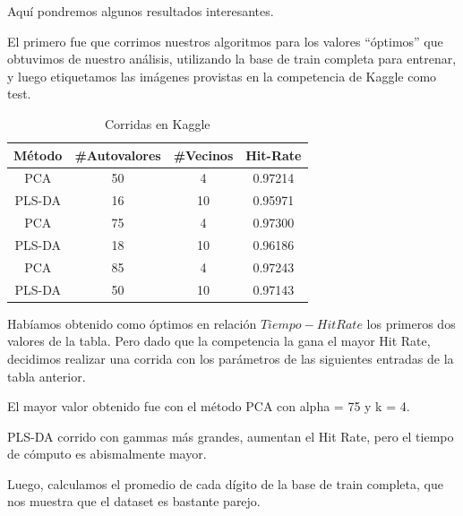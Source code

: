 Aqu\'i pondremos algunos resultados interesantes.

El primero fue que corrimos nuestros algoritmos para los valores ``\'optimos'' que obtuvimos de nuestro an\'alisis, utilizando la base de train completa para entrenar, y luego etiquetamos las im\'agenes provistas en la competencia de Kaggle como test.

\begin{table}[h!]
\begin{center}
\begin{tabular}{|c|c|c|c|}
	\hline
	M\'etodo & \#Autovalores & \#Vecinos & Hit-Rate \\
	\hline
	PCA & 50 & 4 & 0.97214 \\
	\hline
	PLS-DA & 16 & 10 & 0.95971 \\
	\hline
	PCA & 75 & 4 & 0.97300 \\
	\hline
	PLS-DA & 18 & 10 & 0.96186 \\
	\hline
	PCA & 85 & 4 & 0.97243 \\
	\hline
	PLS-DA & 50 & 10 & 0.97143 \\
	\hline
\end{tabular}
\end{center}
\caption{Corridas en Kaggle}
\end{table}

Hab\'iamos obtenido como \'optimos en relaci\'on $Tiempo-Hit Rate$ los primeros dos valores de la tabla. Pero dado que la competencia la gana el mayor Hit Rate, decidimos realizar una corrida con los par\'ametros de las siguientes entradas de la tabla anterior.

El mayor valor obtenido fue con el m\'etodo PCA con alpha = 75 y k = 4.

PLS-DA corrido con gammas m\'as grandes, aumentan el Hit Rate, pero el tiempo de c\'omputo es abismalmente mayor.

Luego, calculamos el promedio de cada d\'igito de la base de train completa, que nos muestra que el dataset es bastante parejo.

